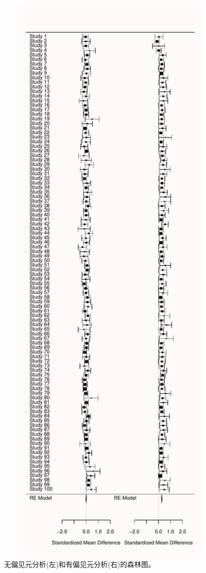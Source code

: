 \documentclass[
  letterpaper,
  DIV=11,
  numbers=noendperiod]{scrreprt}
\begin{document}
\begin{figure}

{\centering \includegraphics[width=1\textwidth,height=\textheight]{12-bias_files/figure-pdf/fig-twoforestplot-1.pdf}

}

\caption{\label{fig-twoforestplot}无偏见元分析(左)和有偏见元分析(右)的森林图。}

\end{figure}
\end{document}
